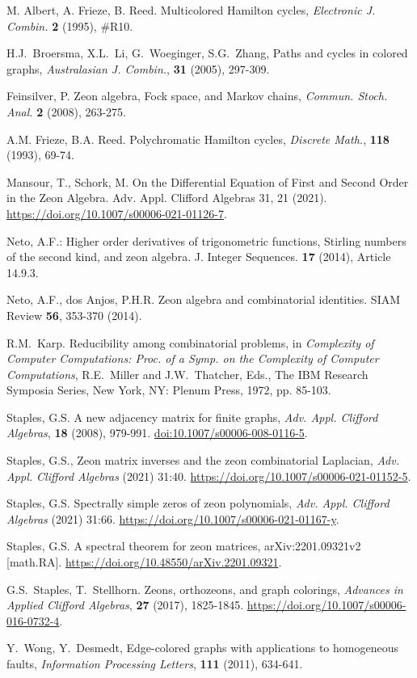\documentclass{article}
\theoremstyle{definition}
\numberwithin{equation}{section}
\begin{document}
\begin{thebibliography}{}

 M. Albert, A. Frieze, B. Reed. Multicolored Hamilton cycles, {\it Electronic J. Combin.} {\bf 2 }(1995), \#R10.

 H.J.~Broersma, X.L.~Li, G.~Woeginger, S.G.~Zhang, Paths and cycles in colored graphs, {\it Australasian J. Combin.}, {\bf 31} (2005), 297-309.

 Feinsilver, P.  Zeon algebra, Fock space, and Markov chains, {\em Commun. Stoch. Anal.} {\bf 2} (2008), 263-275.

 A.M. Frieze, B.A. Reed. Polychromatic Hamilton cycles, {\it Discrete Math.}, {\bf 118} (1993), 69-74.

Mansour, T., Schork, M. On the Differential Equation of First and Second Order in the Zeon Algebra. Adv. Appl. Clifford Algebras 31, 21 (2021). \url{ https://doi.org/10.1007/s00006-021-01126-7}.

 Neto, A.F.: Higher order derivatives of trigonometric functions, Stirling numbers of the second kind, and zeon algebra.  J. Integer Sequences. {\bf 17} (2014), Article 14.9.3.


 Neto, A.F., dos Anjos, P.H.R. Zeon algebra and combinatorial identities. SIAM Review {\bf 56},  353-370 (2014).


 R.M.~Karp. Reducibility among combinatorial problems, in {\it Complexity of Computer Computations: Proc. of a Symp. on the Complexity of Computer Computations}, R.E.~Miller and J.W.~Thatcher, Eds., The IBM Research Symposia Series, New York, NY: Plenum Press, 1972, pp. 85-103.


 Staples, G.S. A new adjacency matrix for finite graphs, {\it Adv. Appl. Clifford Algebras}, {\bf 18} (2008), 979-991.  \url{doi:10.1007/s00006-008-0116-5}.

 Staples, G.S., Zeon matrix inverses and the zeon combinatorial Laplacian, {\it Adv. Appl. Clifford Algebras}  (2021) 31:40.  \url{ https://doi.org/10.1007/s00006-021-01152-5}.

 Staples, G.S. Spectrally simple zeros of zeon polynomials, {\em Adv. Appl. Clifford Algebras} (2021) 31:66.
\url{ https://doi.org/10.1007/s00006-021-01167-y}.

 Staples, G.S. A spectral theorem for zeon matrices, 	arXiv:2201.09321v2 [math.RA]. \url{https://doi.org/10.48550/arXiv.2201.09321}.

 G.S.~Staples, T.~Stellhorn.  Zeons, orthozeons, and graph colorings, {\em Advances in Applied Clifford Algebras}, {\bf 27} (2017), 1825-1845. \url{ https://doi.org/10.1007/s00006-016-0732-4}.


 Y.~Wong, Y.~Desmedt,  Edge-colored graphs with applications to homogeneous faults, {\it Information Processing Letters}, {\bf 111} (2011), 634-641. 


\end{thebibliography}
\end{document}
